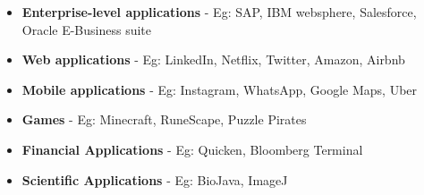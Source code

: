 \begin{flushleft}
	
	\begin{itemize}
		\item \textbf{Enterprise-level applications} - Eg: SAP, IBM websphere, Salesforce, Oracle E-Business suite
		\bigskip	
		
		\item \textbf{Web applications} - Eg: LinkedIn, Netflix, Twitter, Amazon, Airbnb
		
		\item \textbf{Mobile applications} - Eg: Instagram, WhatsApp, Google Maps, Uber
		\bigskip	
		
		\item \textbf{Games} - Eg: Minecraft, RuneScape, Puzzle Pirates		
		\bigskip	
		
		\item \textbf{Financial Applications} - Eg: Quicken, Bloomberg Terminal		
		\bigskip	
		
		\item \textbf{Scientific Applications} - Eg: BioJava, ImageJ		
		
	\end{itemize}
	
\end{flushleft}

\newpage